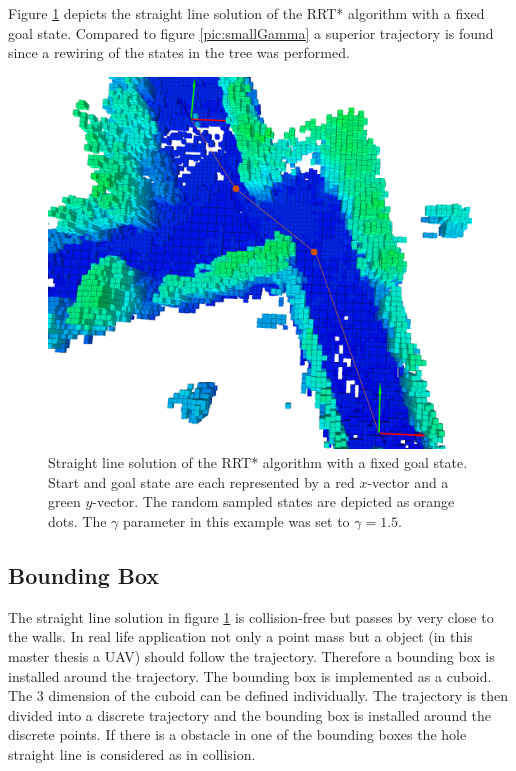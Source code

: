 Figure \ref{pic:smallBBX} depicts the straight line solution of the RRT* algorithm with a fixed goal state. Compared to figure \ref{pic:smallGamma} a superior trajectory is found since a rewiring of the states in the tree was performed.

\begin{figure}[H]
   \centering
   \includegraphics[width=1\textwidth]{pics/smallBBXP.png}
   \caption{Straight line solution of the RRT* algorithm with a fixed goal state. Start and goal state are each represented by a red $x$-vector and a green $y$-vector. The random sampled states are depicted as orange dots. The $\gamma$ parameter in this example was set to $\gamma = 1.5$.}
   \label{pic:smallBBX}
\end{figure}


\subsection{Bounding Box}

The straight line solution in figure \ref{pic:smallBBX} is collision-free but passes by very close to the walls. In real life application not only a point mass but a object (in this master thesis a UAV) should follow the trajectory. Therefore a bounding box is installed around the trajectory. \newline
The bounding box is implemented as a cuboid. The 3 dimension of the cuboid can be defined individually. The trajectory is then divided into a discrete trajectory and the bounding box is installed around the discrete points. If there is a obstacle in one of the bounding boxes the hole straight line is considered as  in collision. \newline

